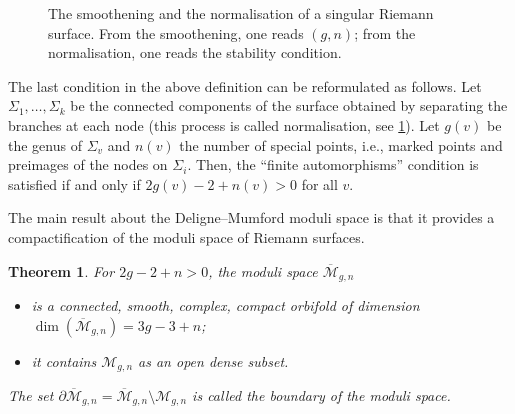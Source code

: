 \documentclass[11pt,reqno]{amsart}
\numberwithin{equation}{section}
\newcommand{\de}{\partial}
\newcommand{\mc}[1]{\mathcal{#1}}
\newcommand{\M}{\mc{M}}
\newcommand{\Mbar}{\overline{\M}}
\theoremstyle{plain}
\newtheorem{theorem}{Theorem}[section]
\theoremstyle{definition}
\begin{document}
\begin{figure}[b]
  \caption{The smoothening and the normalisation of a singular Riemann surface. From the smoothening, one reads $(g,n)$; from the normalisation, one reads the stability condition.}
  \label{fig:sm:norm}
\end{figure}

The last condition in the above definition can be reformulated as follows. Let $\Sigma_1, \dots , \Sigma_k$ be the connected components of the surface obtained by separating the branches at each node (this process is called normalisation, see \cref{fig:sm:norm}). Let $g(v)$ be the genus of $\Sigma_v$ and $n(v)$ the number of special points, i.e., marked points and preimages of the nodes on $\Sigma_i$. Then, the ``finite automorphisms'' condition is satisfied if and only if $2g(v) - 2 + n(v) > 0$ for all $v$.

The main result about the Deligne--Mumford moduli space is that it provides a compactification of the moduli space of Riemann surfaces.

\begin{theorem}
  For $2g - 2 + n > 0$, the moduli space $\Mbar_{g,n}$
  \begin{itemize}
    \item is a connected, smooth, complex, \emph{compact} orbifold of dimension $\dim(\Mbar_{g,n}) = 3g - 3 + n$;

    \item it contains $\M_{g,n}$ as an open dense subset.
  \end{itemize}
  The set $\de\Mbar_{g,n} = \Mbar_{g,n} \setminus \M_{g,n}$ is called the \emph{boundary} of the moduli space.
\end{theorem}
\end{document}
